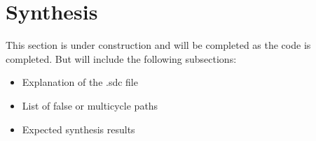 \section{Synthesis}

This section is under construction and will be completed as the code is
completed. But will include the following subsections:

\begin{itemize}
  \item Explanation of the .sdc file %
  \item List of false or multicycle paths
  \item Expected synthesis results
\end{itemize}